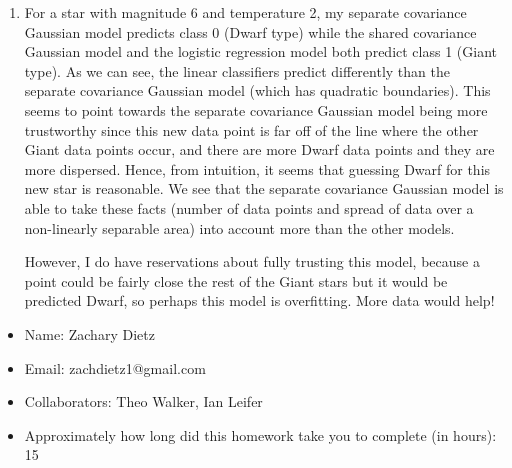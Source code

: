\documentclass[submit]{harvardml}
\begin{document}
\begin{enumerate}
\item 
For a star with magnitude 6 and temperature 2, my separate covariance Gaussian model predicts class 0 (Dwarf type) while the shared covariance Gaussian model and the logistic regression model both predict class 1 (Giant type). As we can see, the linear classifiers predict differently than the separate covariance Gaussian model (which has quadratic boundaries). This seems to point towards the separate covariance Gaussian model being more trustworthy since this new data point is far off of the line where the other Giant data points occur, and there are more Dwarf data points and they are more dispersed. Hence, from intuition, it seems that guessing Dwarf for this new star is reasonable. We see that the separate covariance Gaussian model is able to take these facts (number of data points and spread of data over a non-linearly separable area) into account more than the other models. 

However, I do have reservations about fully trusting this model, because a point could be fairly close the rest of the Giant stars but it would be predicted Dwarf, so perhaps this model is overfitting. More data would help!

\end{enumerate}

\newpage
\begin{itemize}
    \item Name: Zachary Dietz
    \item Email: zachdietz1@gmail.com
    \item Collaborators: Theo Walker, Ian Leifer
    \item Approximately how long did this homework take you to complete (in hours): 15
\end{itemize}
\end{document}
